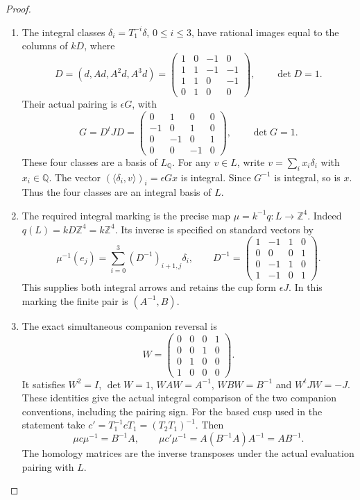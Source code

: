 \documentclass[11pt,a4paper]{article}
\theoremstyle{definition}
\begin{document}
\begin{proof}
\begin{enumerate}[label=\arabic*.]
\item The integral classes
$\delta_i=T_1^{-i}\delta$, $0\leq i\leq3$, have rational images
equal to the columns of $kD$, where
\[
 D=(d,Ad,A^2d,A^3d)=
 \begin{pmatrix}1&0&-1&0\\1&1&-1&-1\\1&1&0&-1\\0&1&0&0\end{pmatrix},
 \qquad \det D=1.
\]
Their actual pairing is $\epsilon G$, with
\[
 G=D^tJD=
 \begin{pmatrix}0&1&0&0\\-1&0&1&0\\0&-1&0&1\\0&0&-1&0\end{pmatrix},
 \qquad \det G=1.
\]
These four classes are a basis of $L_{\mathbb Q}$. For any $v\in L$,
write $v=\sum_i x_i\delta_i$ with $x_i\in\mathbb Q$.
The vector $(\langle\delta_i,v\rangle)_i=\epsilon Gx$ is integral.
Since $G^{-1}$ is integral, so is $x$. Thus the four classes are an
integral basis of $L$.

\item The required integral marking is the precise map
$\mu=k^{-1}q:L\longrightarrow\mathbb Z^4$.
Indeed $q(L)=kD\mathbb Z^4=k\mathbb Z^4$. Its inverse is specified
on standard vectors by
\[
 \mu^{-1}(e_j)=\sum_{i=0}^3(D^{-1})_{i+1,j}\delta_i,
 \qquad
 D^{-1}=\begin{pmatrix}1&-1&1&0\\0&0&0&1\\0&-1&1&0\\1&-1&0&1\end{pmatrix}.
\]
This supplies both integral arrows and retains the cup form
$\epsilon J$. In this marking the finite pair is $(A^{-1},B)$.

\item The exact simultaneous companion reversal is
\[
 W=\begin{pmatrix}0&0&0&1\\0&0&1&0\\0&1&0&0\\1&0&0&0\end{pmatrix}.
\]
It satisfies $W^2=I$, $\det W=1$, $WAW=A^{-1}$,
$WBW=B^{-1}$ and $W^tJW=-J$. These identities give the actual
integral comparison of the two companion conventions, including
the pairing sign. For the based cusp used in the statement take
$c'=T_1^{-1}cT_1=(T_2T_1)^{-1}$. Then
\[
 \mu c\mu^{-1}=B^{-1}A,\qquad
 \mu c'\mu^{-1}=A(B^{-1}A)A^{-1}=AB^{-1}.
\]
The homology matrices are the inverse transposes under the actual
evaluation pairing with $L$.


\end{enumerate}
\end{proof}
\end{document}
